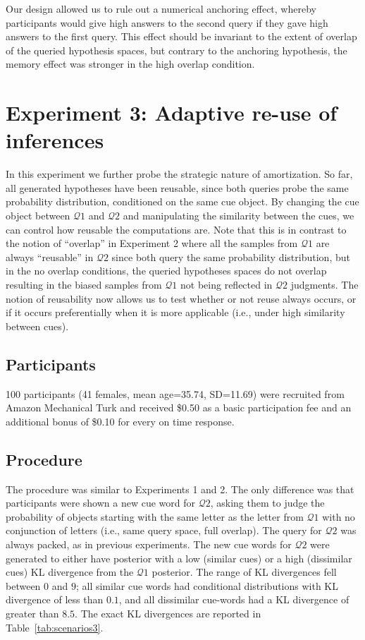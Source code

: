 Our design allowed us to rule out a numerical anchoring effect, whereby participants would give high answers to the second query if they gave high answers to the first query. This effect should be invariant to the extent of overlap of the queried hypothesis spaces, but contrary to the anchoring hypothesis, the memory effect was stronger in the high overlap condition.

\section{Experiment 3: Adaptive re-use of inferences}

In this experiment we further probe the strategic nature of amortization. So far, all generated hypotheses have been reusable, since both queries probe the same probability distribution, conditioned on the same cue object. By changing the cue object between $\mathcal{Q}1$ and $\mathcal{Q}2$ and manipulating the similarity between the cues, we can control how reusable the computations are. Note that this is in contrast to the notion of ``overlap'' in Experiment 2 where all the samples from $\mathcal{Q}1$ are always ``reusable'' in $\mathcal{Q}2$ since both query the same probability distribution, but in the no overlap conditions, the queried hypotheses spaces do not overlap resulting in the biased samples from $\mathcal{Q}1$ not being reflected in $\mathcal{Q}2$ judgments. The notion of reusability now allows us to test whether or not reuse always occurs, or if it occurs preferentially when it is more applicable (i.e., under high similarity between cues).

\subsection{Participants}

100 participants (41 females, mean age=35.74, SD=11.69) were recruited from Amazon Mechanical Turk and received \$0.50 as a basic participation fee and an additional bonus of \$0.10 for every on time response.

\subsection{Procedure}

The procedure was similar to Experiments 1 and 2. The only difference was that participants were shown a new cue word for $\mathcal{Q}2$, asking them to judge the probability of objects starting with the same letter as the letter from $\mathcal{Q}1$ with no conjunction of letters (i.e., same query space, full overlap). The query for $\mathcal{Q}2$ was always packed, as in previous experiments. The new cue words for $\mathcal{Q}2$ were generated to either have posterior with a low (similar cues) or a high (dissimilar cues) KL divergence from the $\mathcal{Q}1$ posterior. The range of KL divergences fell between $0$ and $9$; all similar cue words had conditional distributions with KL divergence of less than $0.1$, and all dissimilar cue-words had a KL divergence of greater than $8.5$. The exact KL divergences are reported in Table~\ref{tab:scenarios3}.

